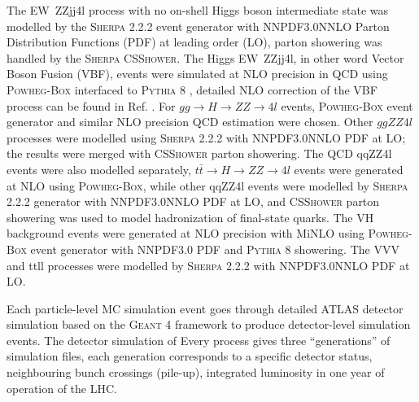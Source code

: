 \documentclass[a4paper,12pt]{article}
\begin{document}
			\par The EW\ ZZjj4l process with no on-shell Higgs boson intermediate state was modelled by the 
			\textsc{Sherpa 2.2.2}\cite{Freeman_2001} event generator with NNPDF3.0NNLO Parton Distribution Functions (PDF)\cite{Ball_2015} at 
			leading order (LO), parton showering was handled by the \textsc{Sherpa CSShower}\cite{Bothmann_2019}. The Higgs EW\ ZZjj4l, in other 
			word Vector Boson Fusion (VBF), events were simulated at NLO precision in QCD using 
			\textsc{Powheg-Box}\cite{Oleari_2010} interfaced to \textsc{Pythia 8}\cite{Sj_strand_2015} , detailed NLO correction 
			of the VBF process can be found in Ref. \cite{Nason_2010}.
			For $gg \rightarrow H\rightarrow ZZ\rightarrow4l$ events, \textsc{Powheg-Box} event generator and similar NLO 
			precision QCD estimation\cite{Alioli:2008tz} were chosen. Other $ggZZ4l$ processes were modelled using \textsc{Sherpa 2.2.2}
			with NNPDF3.0NNLO PDF at LO; the results were merged with \textsc{CSShower} parton showering.
			The QCD qqZZ4l events were also modelled separately, $t\bar{t}\rightarrow H\rightarrow ZZ\rightarrow 4l$ events were generated
			at NLO\cite{Hartanto:2015uka} using \textsc{Powheg-Box}, while other qqZZ4l events were modelled by \textsc{Sherpa 2.2.2} generator
			with NNPDF3.0NNLO PDF at LO, and \textsc{CSShower} parton showering was used to model hadronization of final-state quarks.
			The VH background events were generated at NLO precision with MiNLO\cite{Hamilton_2012} using \textsc{Powheg-Box} event 
			generator with NNPDF3.0 PDF and \textsc{Pythia 8} showering.
			The VVV and ttll processes were modelled by \textsc{Sherpa 2.2.2} with NNPDF3.0NNLO PDF at LO.

			\par Each particle-level MC simulation event goes through detailed ATLAS detector simulation\cite{Aad_2010} based on
			the \textsc{Geant 4}\cite{AGOSTINELLI2003250} framework to produce detector-level simulation events. The detector simulation of Every 
			process gives three ``generations'' of simulation files, each generation corresponds to a specific detector status, neighbouring 
			bunch crossings (pile-up), integrated luminosity in one year of operation of the LHC.
\end{document}
